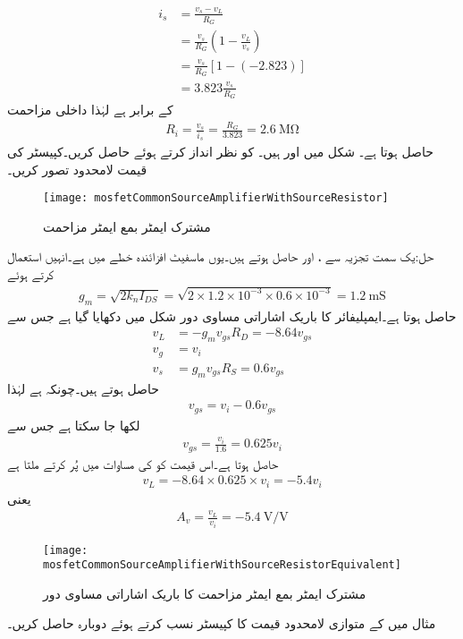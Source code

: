 \begin{align*}
i_s &=\frac{v_s-v_L}{R_G}\\
&=\frac{v_s}{R_G} \left(1-\frac{v_L}{v_s} \right)\\
&=\frac{v_s}{R_G} \left[1-(-2.823) \right]\\
&=3.823 \frac{v_s}{R_G}
\end{align*}
کے برابر ہے لہٰذا داخلی مزاحمت
\begin{align*}
R_i=\frac{v_s}{i_s}=\frac{R_G}{3.823}=\SI{2.6}{\mega \ohm}
\end{align*}
حاصل ہوتا ہے۔
شکل  میں  اور  ہیں۔ کو نظر انداز کرتے ہوئے  حاصل کریں۔کپیسٹر کی قیمت لامحدود تصور کریں۔
\begin{figure}
\centering
\texttt{[image: mosfetCommonSourceAmplifierWithSourceResistor]}
\caption{مشترک ایمٹر بمع ایمٹر مزاحمت}
\label{شکل_ماسفیٹ_مخارج_مزاحمت_کے_ساتھ}
\end{figure}

حل:یک سمت تجزیہ سے ،  اور  حاصل ہوتے ہیں۔یوں ماسفیٹ افزائندہ خطے میں ہے۔انہیں استعمال کرتے ہوئے
\begin{align*}
g_m=\sqrt{2 k_n I_{DS}}=\sqrt{2 \times 1.2 \times 10^{-3} \times 0.6 \times 10^{-3}}=\SI{1.2}{\milli \siemens}
\end{align*}
حاصل ہوتا ہے۔ایمپلیفائر کا باریک اشاراتی مساوی دور شکل  میں دکھایا گیا ہے جس سے
\begin{align*}
v_L&=-g_m v_{gs} R_D=-8.64 v_{gs}\\
v_g&=v_i\\
v_s&=g_m v_{gs} R_S=0.6 v_{gs}
\end{align*}
حاصل ہوتے ہیں۔چونکہ  ہے لہٰذا
\begin{align*}
v_{gs}=v_i-0.6v_{gs}
\end{align*}
لکھا جا سکتا ہے جس سے
\begin{align*}
v_{gs}=\frac{v_i}{1.6}=0.625 v_{i}
\end{align*}
حاصل ہوتا ہے۔اس قیمت کو  کی مساوات میں پُر کرتے ملتا ہے 
\begin{align*}
v_L=-8.64 \times 0.625 \times v_i=-5.4 v_i
\end{align*}
یعنی
\begin{align*}
A_v=\frac{v_L}{v_i}=\SI{-5.4}{\volt \per \volt}
\end{align*}
%
\begin{figure}
\centering
\texttt{[image: mosfetCommonSourceAmplifierWithSourceResistorEquivalent]}
\caption{مشترک ایمٹر بمع ایمٹر مزاحمت کا باریک اشاراتی مساوی دور}
\label{شکل_ماسفیٹ_مخارج_مزاحمت_کے_ساتھ_مساوی}
\end{figure}
مثال  میں  کے متوازی لامحدود قیمت کا کپیسٹر نسب کرتے ہوئے  دوبارہ حاصل کریں۔

